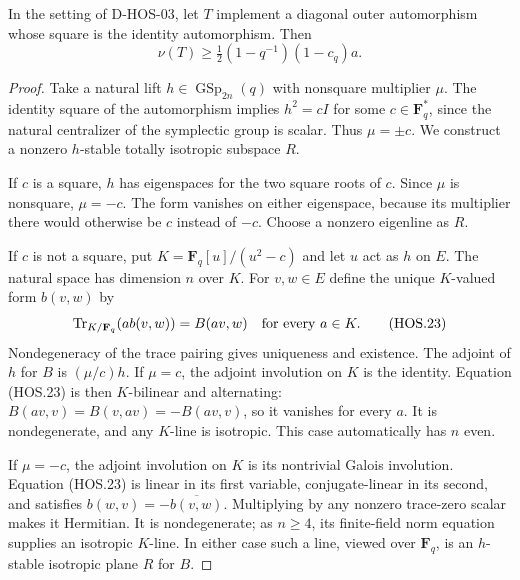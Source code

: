 \begin{lemma}
\label{D-HOS-04}
In the setting of D-HOS-03, let $T$ implement a diagonal outer
automorphism whose square is the identity automorphism. Then
\[
                    \nu(T)\ge\tfrac12(1-q^{-1})(1-c_q)a.
                                                               \tag{HOS.22}
\]
\end{lemma}

\begin{proof}
Take a natural lift $h\in\operatorname{GSp}_{2n}(q)$ with
nonsquare multiplier $\mu$. The identity square of the automorphism
implies $h^2=cI$ for some $c\in\mathbf F_q^*$, since the natural
centralizer of the symplectic group is scalar. Thus $\mu=\pm c$.
We construct a nonzero $h$-stable totally isotropic subspace $R$.

If $c$ is a square, $h$ has eigenspaces for the two square roots
of $c$. Since $\mu$ is nonsquare, $\mu=-c$. The form vanishes
on either eigenspace, because its multiplier there would otherwise
be $c$ instead of $-c$. Choose a nonzero eigenline as $R$.

If $c$ is not a square, put $K=\mathbf F_q[u]/(u^2-c)$ and
let $u$ act as $h$ on $E$. The natural space has dimension $n$
over $K$. For $v,w\in E$ define the unique $K$-valued form
$b(v,w)$ by
\[
       \operatorname{Tr}_{K/\mathbf F_q}(a b(v,w))=B(av,w)
                    \quad\hbox{for every }a\in K.          \tag{HOS.23}
\]
Nondegeneracy of the trace pairing gives uniqueness and existence.
The adjoint of $h$ for $B$ is $(\mu/c)h$.
If $\mu=c$, the adjoint involution on $K$ is the identity.
Equation (HOS.23) is then $K$-bilinear and alternating:
$B(av,v)=B(v,av)=-B(av,v)$, so it vanishes for every $a$.
It is nondegenerate, and any $K$-line is isotropic. This case
automatically has $n$ even.

If $\mu=-c$, the adjoint involution on $K$ is its nontrivial
Galois involution. Equation (HOS.23) is linear in its first
variable, conjugate-linear in its second, and satisfies
$b(w,v)=-\overline{b(v,w)}$. Multiplying by any nonzero
trace-zero scalar makes it Hermitian. It is nondegenerate;
as $n\ge4$, its finite-field norm equation supplies an isotropic
$K$-line. In either case such a line, viewed over $\mathbf F_q$,
is an $h$-stable isotropic plane $R$ for $B$.


\end{proof}
